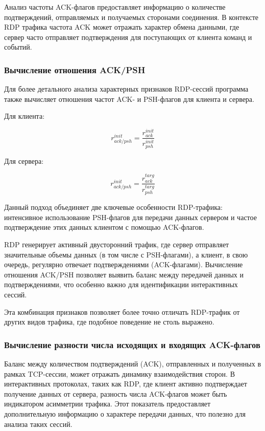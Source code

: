 \documentclass[spec, och, diploma]{SCWorks}
\begin{document}
  Анализ частоты ACK-флагов предоставляет информацию о количестве подтверждений, отправляемых и получаемых сторонами 
  соединения. В контексте RDP трафика частота ACK может отражать характер обмена данными, где сервер часто отправляет 
  подтверждения для поступающих от клиента команд и событий.

\subsubsection{Вычисление отношения ACK/PSH}

Для более детального анализа характерных признаков RDP-сессий программа также вычисляет отношения частот ACK- и PSH-флагов 
для клиента и сервера.

Для клиента:

\begin{equation}
  r_{ack/psh}^{init} = \frac{r_{ack}^{init}}{r_{psh}^{init}}
\end{equation}

Для сервера:

\begin{equation}
  r_{ack/psh}^{init} = \frac{r_{ack}^{targ}}{r_{psh}^{targ}}
\end{equation}

Данный подход объединяет две ключевые особенности RDP-трафика: интенсивное использование PSH-флагов для передачи данных сервером и 
частое подтверждение этих данных клиентом с помощью ACK-флагов.

RDP генерирует активный двусторонний трафик, где сервер отправляет значительные объемы данных (в том числе с PSH-флагами), 
а клиент, в свою очередь, регулярно отвечает подтверждениями (ACK-флагами). Вычисление отношения ACK/PSH позволяет выявить 
баланс между передачей данных и подтверждениями, что особенно важно для идентификации интерактивных сессий.

Эта комбинация признаков позволяет более точно отличать RDP-трафик от других видов трафика, где подобное поведение не столь выражено.

\subsubsection{Вычисление разности числа исходящих и входящих ACK-флагов}

Баланс между количеством подтверждений (ACK), отправленных и полученных в рамках TCP-сессии, может отражать динамику 
взаимодействия сторон. В интерактивных протоколах, таких как RDP, где клиент активно подтверждает получение данных от 
сервера, разность числа ACK-флагов может быть индикатором асимметрии трафика. Этот показатель предоставляет дополнительную 
информацию о характере передачи данных, что полезно для анализа таких сессий.
\end{document}
